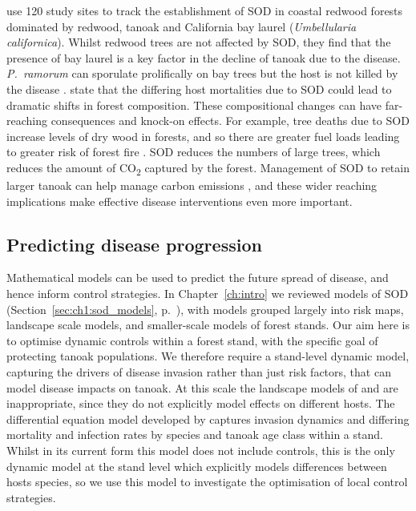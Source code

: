 \citet{maloney_establishment_2005} use 120 study sites to track the establishment of SOD in coastal redwood forests dominated by redwood, tanoak and California bay laurel (\textit{Umbellularia californica}). Whilst redwood trees are not affected by SOD, they find that the presence of bay laurel is a key factor in the decline of tanoak due to the disease. \textit{P.~ramorum} can sporulate prolifically on bay trees but the host is not killed by the disease \citep{davidson_sources_2008}. \citet{maloney_establishment_2005} state that the differing host mortalities due to SOD could lead to dramatic shifts in forest composition. These compositional changes can have far-reaching consequences and knock-on effects. For example, tree deaths due to SOD increase levels of dry wood in forests, and so there are greater fuel loads leading to greater risk of forest fire \citep{forrestel_disease_2015}. SOD reduces the numbers of large trees, which reduces the amount of CO\textsubscript{2} captured by the forest. Management of SOD to retain larger tanoak can help manage carbon emissions \citep{twieg_reducing_2017}, and these wider reaching implications make effective disease interventions even more important.

\subsection{Predicting disease progression\label{sec:ch5:sod_models}}

Mathematical models can be used to predict the future spread of disease, and hence inform control strategies. In Chapter~\ref{ch:intro} we reviewed models of SOD (Section~\ref{sec:ch1:sod_models}, p.~\pageref{sec:ch1:sod_models}), with models grouped largely into risk maps, landscape scale models, and smaller-scale models of forest stands. Our aim here is to optimise dynamic controls within a forest stand, with the specific goal of protecting tanoak populations. We therefore require a stand-level dynamic model, capturing the drivers of disease invasion rather than just risk factors, that can model disease impacts on tanoak. At this scale the landscape models of \citet{meentemeyer_epidemiological_2011} and \citet{tonini_modeling_2018} are inappropriate, since they do not explicitly model effects on different hosts. The differential equation model developed by \citet{cobb_ecosystem_2012} captures invasion dynamics and differing mortality and infection rates by species and tanoak age class within a stand. Whilst in its current form this model does not include controls, this is the only dynamic model at the stand level which explicitly models differences between hosts species, so we use this model to investigate the optimisation of local control strategies.

